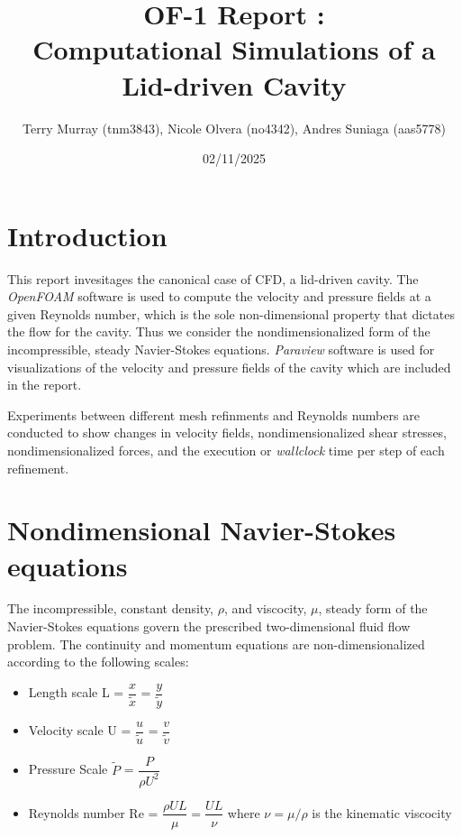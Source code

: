 \documentclass[11pt]{article}
\title{\bf OF-1 Report : \\[2mm] Computational Simulations of a Lid-driven Cavity}
\author{Terry Murray (tnm3843), Nicole Olvera (no4342), Andres Suniaga (aas5778)}
\date{02/11/2025}
\begin{document}
\maketitle

\noindent\makebox[\textwidth]{\rule{\textwidth}{0.2pt}}
\tableofcontents
\noindent\makebox[\textwidth]{\rule{\textwidth}{0.2pt}}
\pagebreak

\section{Introduction}
This report invesitages the canonical case of CFD, a lid-driven cavity. The \textit{OpenFOAM} software is used to compute the velocity and pressure fields at a given Reynolds number, which is the sole non-dimensional property that dictates the flow for the cavity. Thus we consider the nondimensionalized form of the incompressible, steady Navier-Stokes equations. \textit{Paraview} software is used for visualizations of the velocity and pressure fields of the cavity which are included in the report.
\vspace{2.5mm}

Experiments between different mesh refinments and Reynolds numbers are conducted to show changes in velocity fields, nondimensionalized shear stresses, nondimensionalized forces, and the execution or \textit{wallclock} time per step of each refinement. 




\section{Nondimensional Navier-Stokes equations}
The incompressible, constant density, $\rho$, and viscocity, $\mu$, steady form of the Navier-Stokes equations govern the prescribed two-dimensional fluid flow problem. The continuity and momentum equations are non-dimensionalized according to the following scales:
\begin{itemize}
    \item Length scale L = $\dfrac{x}{\tilde{x}}$ = $\dfrac{y}{\tilde{y}}$
    \item Velocity scale U = $\dfrac{u}{\tilde{u}}$ = $\dfrac{v}{\tilde{v}}$
    \item Pressure Scale $\tilde{P}$ = $\dfrac{P}{\rho U^2}$
    \item Reynolds number Re = $\dfrac{\rho UL}{\mu} = \dfrac{UL}{\nu}$ where $\nu = \mu/\rho$ is the kinematic viscocity
\end{itemize}
\end{document}
